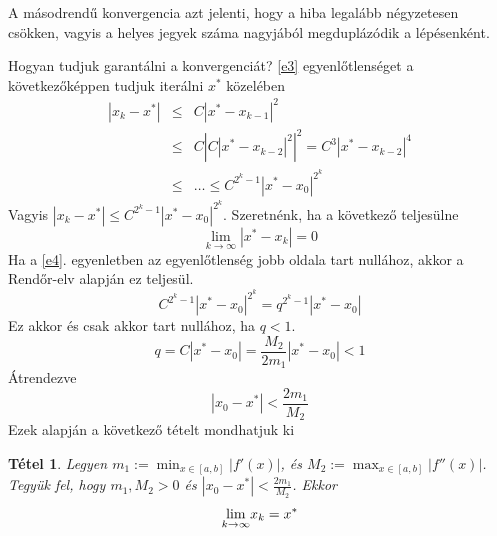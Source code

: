 \documentclass[a4paper,12pt]{report}
\newtheorem{Tet}{Tétel}[section]
\begin{document}
			A másodrendű konvergencia azt jelenti, hogy a hiba legalább négyzetesen csökken, vagyis a helyes jegyek száma nagyjából megduplázódik a lépésenként.
            
			Hogyan tudjuk garantálni a konvergenciát? \ref{e3} egyenlőtlenséget a következőképpen tudjuk iterálni $x^*$ közelében
			\begin{eqnarray}
				|x_k-x^*|&\leq& C |x^*-x_{k-1}|^2\\
				&\leq & C\left |C|x^*-x_{k-2}|^2\right |^2=C^3|x^*-x_{k-2}|^4\\
				&\leq & \ldots\leq C^{2^k-1} |x^*-x_0|^{2^k}\label{e4}
			\end{eqnarray}
			Vagyis $|x_k-x^*|\leq C^{2^k-1}|x^*-x_0|^{2^k}$. Szeretnénk, ha a következő teljesülne
			\[ \lim_{k \to \infty} |x^*-x_k|=0\]
			Ha a \ref{e4}. egyenletben az egyenlőtlenség jobb oldala tart nullához, akkor a Rendőr-elv alapján ez teljesül.
			\[ C^{2^k-1}|x^*-x_0|^{2^k}=q^{2^k-1}|x^*-x_0| \] 
			Ez akkor és csak akkor tart nullához, ha $q<1$.
			\[q=C|x^*-x_0|=  \frac{M_2}{2 m_1} \left |x^*-x_0 \right | < 1 \]
			Átrendezve
			\[ |x_0-x^*|<  \frac{2 m_1}{M_2} \]
			Ezek alapján a következő tételt mondhatjuk ki\
			\begin{Tet}
				Legyen $m_1:=\min_{x \in [a,b]} |f'(x)|$, és $M_2:=\max_{x\in [a,b]} |f''(x)|$. Tegyük fel, hogy $m_1, M_2 > 0$ és $ |x_0-x^*|<  \frac{2 m_1}{M_2} $. Ekkor
				\[\smash{\displaystyle \lim_{k\to \infty} }x_k= x^*\]
			\end{Tet}
            
            
            
            
            
            
            
            
            
            
            
            
            
            
            
            
            
            
            
            
            
            
            
            
            
            
            
            
            
            
            
            
            
\end{document}
